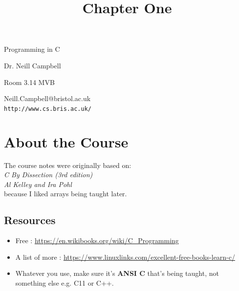 \documentclass[a4,portraitt]{slides}
\title{Chapter One}
\begin{document}
\begin{center}
{\Large
Programming in C
}

Dr. Neill Campbell

Room 3.14 MVB

Neill.Campbell@bristol.ac.uk\\[1em]
{\small
\verb^http://www.cs.bris.ac.uk/^
}
\end{center}

\section*{About the Course}

{\footnotesize
The course notes were originally based on:\\
{\it
C By Dissection (3rd edition)\\
Al Kelley and Ira Pohl\\
}
because I liked arrays being taught later.
}

\newpage
\subsection*{Resources}
\begin{itemize}
\item Free : \url{https://en.wikibooks.org/wiki/C_Programming}
\item A list of more : \url{https://www.linuxlinks.com/excellent-free-books-learn-c/}
\item Whatever you use, make sure it's {\bf ANSI C} that's being taught, not something else e.g. C11 or C++.
\end{itemize}

\newpage
\end{document}
